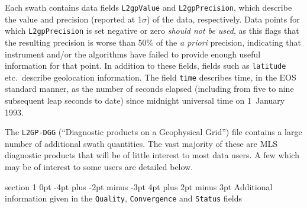 \documentclass[11pt,draft]{report}
\makeatletter
\renewcommand{\section}{\@startsection%
  {section}%
  {1}%
  {0pt}%
  {-4pt plus -2pt minus -3pt}%
  {4pt plus 2pt minus 3pt}%
  {\Large\sffamily\fontseries{sb}\selectfont\flushleft\color{SectionColor}\figureversion{tabular}}}%
\makeatother
\begin{document}
Each swath contains data fields \texttt{L2gpValue} and
\texttt{L2gpPrecision}, which describe the value and precision (reported
at 1$\sigma$) of the data, respectively.  Data points for which
\texttt{L2gpPrecision} is set negative or zero \emph{should not be
  used}, as this flags that the resulting precision is worse than 50\%
of the \emph{a priori} precision, indicating that instrument and/or the
algorithms have failed to provide enough useful information for that
point.  In addition to these fields, fields such as \texttt{latitude}
etc.\ describe geolocation information.  The field \texttt{time}
describes time, in the EOS standard manner, as the number of seconds
elapsed (including from five to nine subsequent leap seconds to date)
since midnight universal time on 1~January 1993.

The \texttt{L2GP-DGG} (``Diagnostic products on a Geophysical Grid'')
file contains a large number of additional swath quantities.  The vast
majority of these are MLS diagnostic products that will be of little
interest to most data users.  A few which may be of interest to some
users are detailed below.

\section{Additional information given in the \texttt{Quality},
  \texttt{Convergence} and \texttt{Status} fields}
\label{sec:StatusQuality}
\end{document}
